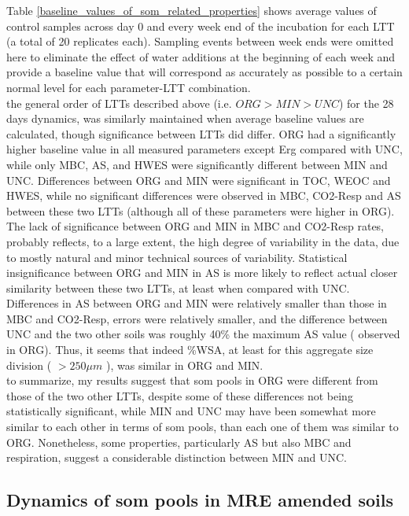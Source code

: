 \documentclass[12pt]{report}
\begin{document}
		Table \ref{baseline_values_of_som_related_properties} shows average values of control samples across day 0 and every week end of the incubation for each LTT (a total of 20 replicates each). Sampling events between week ends were omitted here to eliminate the effect of water additions at the beginning of each week and provide a baseline value that will correspond as accurately as possible to a certain normal level for each parameter-LTT combination.\\
		
		\noindent the general order of LTTs described above (i.e. $ ORG > MIN > UNC $) for the 28 days dynamics, was similarly maintained when average baseline values are calculated, though significance between LTTs did differ.
		ORG had a significantly higher baseline value in all measured parameters except Erg compared with UNC, while only MBC, AS, and HWES were significantly different between MIN and UNC.
		Differences between ORG and MIN were significant in TOC, WEOC and HWES, while no significant differences were observed in MBC, CO2-Resp and AS between these two LTTs (although all of these parameters were higher in ORG).
		The lack of significance between ORG and MIN in MBC and CO2-Resp rates, probably reflects, to a large extent, the high degree of variability in the data, due to mostly natural and minor technical sources of variability.  Statistical insignificance between ORG and MIN in AS is more likely to reflect actual closer similarity between these two LTTs, at least when compared with UNC. Differences in AS between ORG and MIN were relatively smaller than those in MBC and CO2-Resp, errors were relatively smaller, and the difference between UNC and the two other soils was roughly 40\% the maximum AS value ( observed in ORG). Thus, it seems that indeed \%WSA, at least for this aggregate size division ( $ >250\mu m$ ), was similar in ORG and MIN.\\
		to summarize, my results suggest that \gls{som} pools in ORG were different from those of the two other LTTs, despite some of these differences not being statistically significant, while MIN and UNC may have been somewhat more similar to each other in terms of \gls{som} pools, than each one of them was similar to ORG. Nonetheless, some properties, particularly AS but also MBC and respiration, suggest a considerable distinction between MIN and UNC. \\
		
		
		
		\subsection{Dynamics of \gls{som} pools in MRE amended soils}
		
\end{document}
